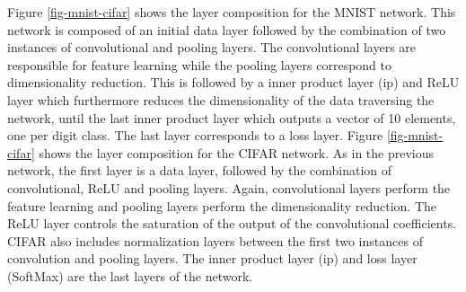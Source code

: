 Figure \ref{fig-mnist-cifar} shows the layer composition for the MNIST network. 
This network is composed of an initial data layer followed by the 
combination of two instances of convolutional and pooling layers. The 
convolutional layers are responsible for feature learning while the 
pooling layers correspond to dimensionality reduction. 
This is followed by a inner product layer (ip) and ReLU layer which furthermore reduces the dimensionality 
of the data traversing the network, until the last inner product layer which 
outputs a vector of 10 elements, one per digit class. The last layer 
corresponds to a loss layer.  
Figure \ref{fig-mnist-cifar} shows the layer composition for the CIFAR network. 
As in the previous network, the first layer is a data layer, followed by 
the combination of convolutional, ReLU and pooling layers. Again, convolutional 
layers perform the feature learning and pooling layers perform the 
dimensionality reduction. The ReLU layer controls the saturation of 
the output of the convolutional coefficients. CIFAR also includes 
normalization layers between the first two instances of convolution and pooling 
layers.  The inner product layer (ip) and loss layer (SoftMax) are the last layers of the network. 

